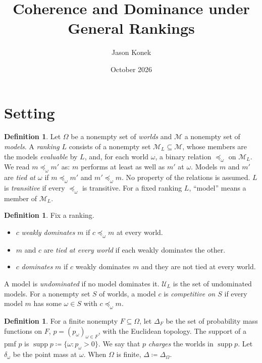 \documentclass[11pt]{article}
\title{Coherence and Dominance under General Rankings}
\author{Jason Konek}
\date{October 2026}
\theoremstyle{definition}
\newtheorem{definition}[theorem]{Definition}
\newcommand{\M}{\mathcal M}
\newcommand{\U}{\mathcal U}
\newcommand{\supp}{\operatorname{supp}}
\begin{document}
\maketitle

\begin{abstract}
\end{abstract}

\section{Setting}\label{sec:setting}

\begin{definition}\label{def:rankings}
Let $\Omega$ be a nonempty set of \emph{worlds} and $\M$ a nonempty set of \emph{models}. A \emph{ranking} $L$ consists of a nonempty set $\M_L\subseteq\M$, whose members are the models \emph{evaluable} by $L$, and, for each world $\omega$, a binary relation $\preceq_\omega$ on $\M_L$. We read $m\preceq_\omega m'$ as: $m$ performs at least as well as $m'$ at $\omega$. Models $m$ and $m'$ are \emph{tied at $\omega$} if $m\preceq_\omega m'$ and $m'\preceq_\omega m$. No property of the relations is assumed. $L$ is \emph{transitive} if every $\preceq_\omega$ is transitive. For a fixed ranking $L$, ``model'' means a member of $\M_L$.
\end{definition}

\begin{definition}\label{def:dominance}
Fix a ranking.
\begin{itemize}[leftmargin=*]
\item $c$ \emph{weakly dominates} $m$ if $c\preceq_\omega m$ at every world.
\item $m$ and $c$ are \emph{tied at every world} if each weakly dominates the other.
\item $c$ \emph{dominates} $m$ if $c$ weakly dominates $m$ and they are not tied at every world.
\end{itemize}
A model is \emph{undominated} if no model dominates it. $\U_L$ is the set of undominated models. For a nonempty set $S$ of worlds, a model $c$ is \emph{competitive on $S$} if every model $m$ has some $\omega\in S$ with $c\preceq_\omega m$.
\end{definition}

\begin{definition}\label{def:priors}
For a finite nonempty $F\subseteq\Omega$, let $\Delta_F$ be the set of probability mass functions on $F$, $p=(p_\omega)_{\omega\in F}$, with the Euclidean topology. The support of a pmf $p$ is $\supp p\coloneqq\{\omega:p_\omega>0\}$. We say that $p$ \emph{charges} the worlds in $\supp p$. Let $\delta_\omega$ be the point mass at $\omega$. When $\Omega$ is finite, $\Delta\coloneqq\Delta_\Omega$.
\end{definition}
\end{document}
